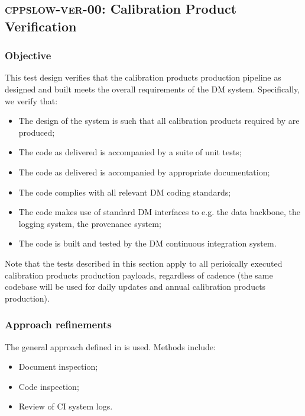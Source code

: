 \subsection{\textsc{cppslow-ver-00}: Calibration Product Verification}
\label{cppslow-ver-00}

\subsubsection{Objective}

This test design verifies that the calibration products production pipeline as
designed and built meets the overall requirements of the DM system.
Specifically, we verify that:

\begin{itemize}

  \item{The design of the system is such that all calibration products
  required by  are produced;}

  \item{The code as delivered is accompanied by a suite of unit tests;}

  \item{The code as delivered is accompanied by appropriate documentation;}

  \item{The code complies with all relevant DM coding standards;}

  \item{The code makes use of standard DM interfaces to e.g. the data
  backbone, the logging system, the provenance system;}

  \item{The code is built and tested by the DM continuous integration system.}

\end{itemize}

Note that the tests described in this section apply to all perioically
executed calibration products production payloads, regardless of cadence (the
same codebase will be used for daily updates and annual calibration products
production).

\subsubsection{Approach refinements}

The general approach defined in  is used. Methods include:

\begin{itemize}

  \item{Document inspection;}
  \item{Code inspection;}
  \item{Review of CI system logs.}

\end{itemize}

